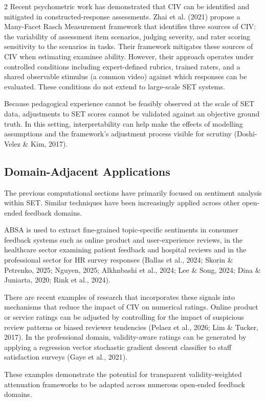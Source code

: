 \documentclass{article}
\begin{document}
\begin{multicols*}{2}
Recent psychometric work has demonstrated that CIV can be identified and mitigated in constructed-response assessments. Zhai et al. (2021) propose a Many-Facet Rasch Measurement framework that identifies three sources of CIV: the variability of assessment item scenarios, judging severity, and rater scoring sensitivity to the scenarios in tasks. Their framework mitigates these sources of CIV when estimating examinee ability. However, their approach operates under controlled conditions including expert-defined rubrics, trained raters, and a shared observable stimulus (a common video) against which responses can be evaluated. These conditions do not extend to large-scale SET systems.

Because pedagogical experience cannot be feasibly observed at the scale of SET data, adjustments to SET scores cannot
be validated against an objective ground truth. In this setting, interpretability can help make the effects of
modelling assumptions and the framework's adjustment process visible for scrutiny (Doshi-Velez \& Kim, 2017).

\subsection{Domain-Adjacent Applications}
The previous computational sections have primarily focused on sentiment analysis within SET. Similar techniques have been increasingly applied across other open-ended feedback domains. 

ABSA is used to extract fine-grained topic-specific sentiments in consumer feedback systems such as online product and user-experience reviews, in the healthcare sector examining patient feedback and hospital reviews and in the professional sector for HR survey responses (Ballas et al., 2024; Skorin \& Petrenko, 2025; Nguyen, 2025; Alkhnbashi et al., 2024; Lee \& Song, 2024; Dina \& Juniarta, 2020; Rink et al., 2024).

There are recent examples of research that incorporates these signals into mechanisms that reduce the impact of CIV on numerical ratings. Online product or service ratings can be adjusted by controlling for the impact of suspicious review patterns or biased reviewer tendencies (Pelaez et al., 2026; Lim \& Tucker, 2017). In the professional domain, validity-aware ratings can be generated by applying a regression vector stochastic gradient descent classifier to staff satisfaction surveys (Gaye et al., 2021).

These examples demonstrate the potential for transparent validity-weighted attenuation frameworks to be adapted across numerous open-ended feedback domains.


\end{multicols*}
\end{document}
